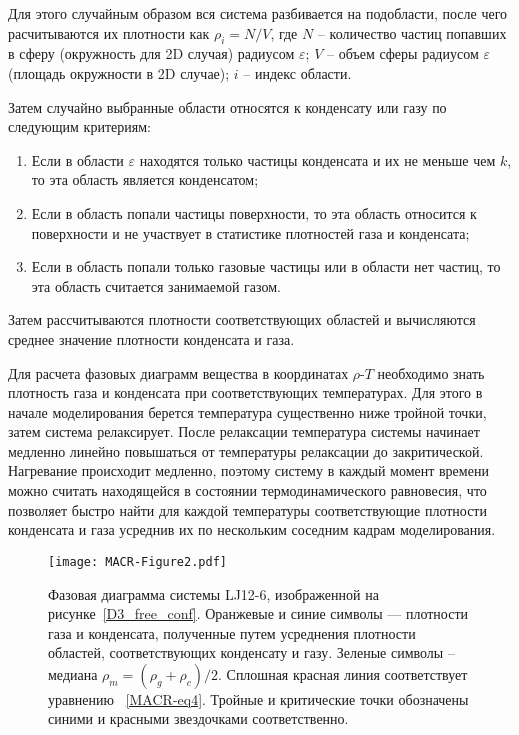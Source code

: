 Для этого случайным образом вся система разбивается на подобласти, после чего расчитываются их плотности как $\rho_i = N / V$, где $N$ -- количество частиц попавших в сферу (окружность для 2D случая) радиусом $\varepsilon$; $V$ -- объем сферы радиусом $\varepsilon$ (площадь окружности в 2D случае); $i$ -- индекс области.

Затем случайно выбранные области относятся к конденсату или газу по следующим критериям:
\begin{enumerate}
    \item Если в области $\varepsilon$ находятся только частицы конденсата и их не меньше чем $k$, то эта область является конденсатом;
    \item Если в область попали частицы поверхности, то эта область относится к поверхности и не участвует в статистике плотностей газа и конденсата;
    \item Если в область попали только газовые частицы или в области нет частиц, то эта область считается занимаемой газом.
\end{enumerate}
Затем рассчитываются плотности соответствующих областей и вычисляются среднее значение плотности конденсата и газа.

Для расчета фазовых диаграмм вещества в координатах $\rho$-$T$ необходимо знать плотность газа и конденсата при соответствующих температурах.
Для этого в начале моделирования берется температура существенно ниже тройной точки, затем система релаксирует.
После релаксации температура системы начинает медленно линейно повышаться от температуры релаксации до закритической.
Нагревание происходит медленно, поэтому систему в каждый момент времени можно считать находящейся в состоянии термодинамического равновесия, что позволяет быстро найти для каждой температуры соответствующие плотности конденсата и газа усреднив их по нескольким соседним кадрам моделирования.

\begin{figure}[!t]
    \centering
    \texttt{[image: MACR-Figure2.pdf]}
    \caption{Фазовая диаграмма системы LJ12-6, изображенной на рисунке~\ref{D3_free_conf}.
    Оранжевые и синие символы — плотности газа и конденсата, полученные путем усреднения плотности областей, соответствующих конденсату и газу.
    Зеленые символы -- медиана $\rho_m=(\rho_g+\rho_c)/2$.
    Сплошная красная линия соответствует уравнению ~\eqref{MACR-eq4}.
    Тройные и критические точки обозначены синими и красными звездочками соответственно.}
    \label{phase_diagram}
\end{figure}


